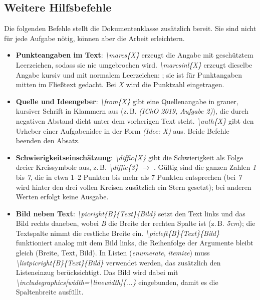 \documentclass[../main.tex]{subfiles}
\begin{document}
\subsection{Weitere Hilfsbefehle}
Die folgenden Befehle stellt die Dokumentenklasse zus\"atzlich bereit. Sie sind nicht f\"ur jede Aufgabe n\"otig, k\"onnen aber die Arbeit erleichtern.
\begin{itemize}
    \item \textbf{Punkteangaben im Text}: \textit{\hypertarget{marcs}{\textbackslash marcs\{X\}}} erzeugt die Angabe  mit gesch\"utztem Leerzeichen, sodass sie nie umgebrochen wird. \textit{\hypertarget{marcsinl}{\textbackslash marcsinl\{X\}}} erzeugt dieselbe Angabe kursiv und mit normalem Leerzeichen: ; sie ist f\"ur Punktangaben mitten im Flie\ss{}text gedacht. Bei \textit{X} wird die Punktzahl eingetragen.
    \item \textbf{Quelle und Ideengeber}: \textit{\hypertarget{from}{\textbackslash from\{X\}}} gibt eine Quellenangabe in grauer, kursiver Schrift in Klammern aus (z.\,B. \textit{(IChO 2019, Aufgabe 2)}), die durch negativen Abstand dicht unter dem vorherigen Text steht. \textit{\hypertarget{auth}{\textbackslash auth\{X\}}} gibt den Urheber einer Aufgabenidee in der Form \textit{(Idee: X)} aus. Beide Befehle beenden den Absatz.
    \item \textbf{Schwierigkeitseinsch\"atzung}: \textit{\hypertarget{diffic}{\textbackslash diffic\{X\}}} gibt die Schwierigkeit als Folge dreier Kreissymbole aus, z.\,B. \textit{\textbackslash diffic\{3\}} $\rightarrow$ . G\"ultig sind die ganzen Zahlen \textit{1} bis \textit{7}, die in etwa 1--2 Punkten bis mehr als 7 Punkten entsprechen (bei \textit{7} wird hinter den drei vollen Kreisen zus\"atzlich ein Stern gesetzt); bei anderen Werten erfolgt keine Ausgabe.
    \item \textbf{Bild neben Text}: \textit{\hypertarget{picright}{\textbackslash picright\{B\}\{Text\}\{Bild\}}} setzt den Text links und das Bild rechts daneben, wobei \textit{B} die Breite der rechten Spalte ist (z.\,B. \textit{5cm}); die Textspalte nimmt die restliche Breite ein. \textit{\hypertarget{picleft}{\textbackslash picleft\{B\}\{Text\}\{Bild\}}} funktioniert analog mit dem Bild links, die Reihenfolge der Argumente bleibt gleich (Breite, Text, Bild). In Listen (\textit{enumerate}, \textit{itemize}) muss \textit{\hypertarget{listpicright}{\textbackslash listpicright\{B\}\{Text\}\{Bild\}}} verwendet werden, das zus\"atzlich den Listeneinzug ber\"ucksichtigt. Das Bild wird dabei mit \textit{\textbackslash includegraphics[width=\textbackslash linewidth]\{...\}} eingebunden, damit es die Spaltenbreite ausf\"ullt.

\end{itemize}
\end{document}
